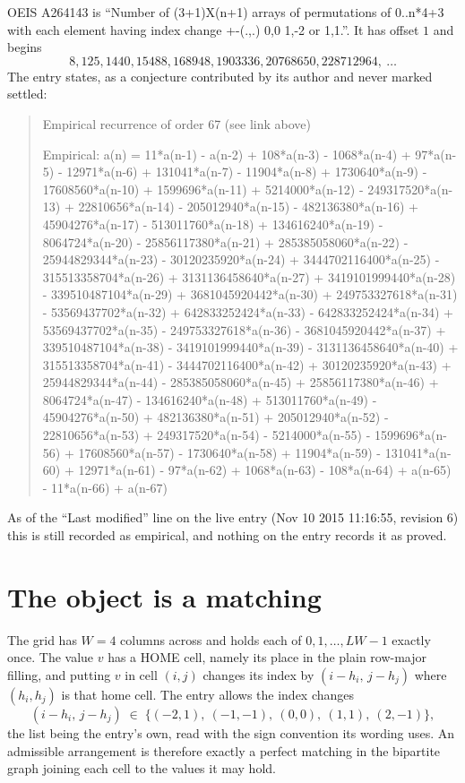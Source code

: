 \documentclass[11pt,a4paper]{article}
\theoremstyle{plain}
\theoremstyle{definition}
\begin{document}
OEIS A264143 is ``Number of (3+1)X(n+1) arrays of permutations of 0..n*4+3 with each element having index change +-(.,.) 0,0 1,-2 or 1,1.''. It has offset $1$ and begins
\[
8, 125, 1440, 15488, 168948, 1903336, 20768650, 228712964,\ \dots
\]
The entry states, as a conjecture contributed by its author and never marked settled:
\begin{quote}
Empirical recurrence of order 67 (see link above)

Empirical: a(n) = 11*a(n-1) - a(n-2) + 108*a(n-3) - 1068*a(n-4) + 97*a(n-5) - 12971*a(n-6) + 131041*a(n-7) - 11904*a(n-8) + 1730640*a(n-9) - 17608560*a(n-10) + 1599696*a(n-11) + 5214000*a(n-12) - 249317520*a(n-13) + 22810656*a(n-14) - 205012940*a(n-15) - 482136380*a(n-16) + 45904276*a(n-17) - 513011760*a(n-18) + 134616240*a(n-19) - 8064724*a(n-20) - 25856117380*a(n-21) + 285385058060*a(n-22) - 25944829344*a(n-23) - 30120235920*a(n-24) + 3444702116400*a(n-25) - 315513358704*a(n-26) + 3131136458640*a(n-27) + 3419101999440*a(n-28) - 339510487104*a(n-29) + 3681045920442*a(n-30) + 249753327618*a(n-31) - 53569437702*a(n-32) + 642833252424*a(n-33) - 642833252424*a(n-34) + 53569437702*a(n-35) - 249753327618*a(n-36) - 3681045920442*a(n-37) + 339510487104*a(n-38) - 3419101999440*a(n-39) - 3131136458640*a(n-40) + 315513358704*a(n-41) - 3444702116400*a(n-42) + 30120235920*a(n-43) + 25944829344*a(n-44) - 285385058060*a(n-45) + 25856117380*a(n-46) + 8064724*a(n-47) - 134616240*a(n-48) + 513011760*a(n-49) - 45904276*a(n-50) + 482136380*a(n-51) + 205012940*a(n-52) - 22810656*a(n-53) + 249317520*a(n-54) - 5214000*a(n-55) - 1599696*a(n-56) + 17608560*a(n-57) - 1730640*a(n-58) + 11904*a(n-59) - 131041*a(n-60) + 12971*a(n-61) - 97*a(n-62) + 1068*a(n-63) - 108*a(n-64) + a(n-65) - 11*a(n-66) + a(n-67)
\end{quote}
As of the ``Last modified'' line on the live entry (Nov 10 2015 11:16:55, revision 6) this is still
recorded as empirical, and nothing on the entry records it as proved.

\section{The object is a matching}

The grid has $W=4$ columns across and holds each of $0,1,\dots,LW-1$ exactly once. The value
$v$ has a HOME cell, namely its place in the plain row-major filling, and putting $v$ in cell
$(i,j)$ changes its index by $(i-h_i,\,j-h_j)$ where $(h_i,h_j)$ is that home cell. The entry
allows the index changes
\[
(i-h_i,\,j-h_j)\;\in\;\{(-2,1),\ (-1,-1),\ (0,0),\ (1,1),\ (2,-1)\},
\]
the list being the entry's own, read with the sign convention its wording uses. An admissible
arrangement is therefore exactly a perfect matching in the bipartite graph joining each cell to
the values it may hold.
\end{document}
